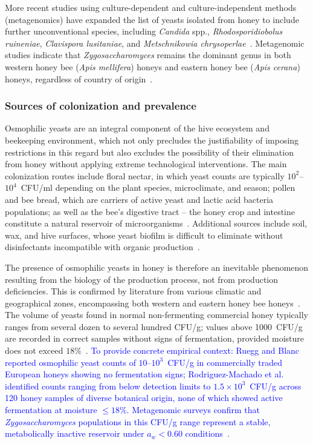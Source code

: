 More recent studies using culture-dependent and culture-independent
methods (metagenomics) have expanded the list of yeasts isolated
from honey to include further unconventional species, including
\textit{Candida} spp., \textit{Rhodosporidiobolus ruineniae},
\textit{Clavispora lusitaniae}, and \textit{Metschnikowia
chrysoperlae}~\cite{rodriguezmachado2024}.
Metagenomic studies indicate that \textit{Zygosaccharomyces}
remains the dominant genus in both western honey bee
(\textit{Apis mellifera}) honeys and eastern honey bee
(\textit{Apis cerana}) honeys, regardless of country of
origin~\cite{yeastbiodiversity2025}.

\subsubsection{Sources of colonization and prevalence}
Osmophilic yeasts are an integral component of the hive ecosystem
and beekeeping environment, which not only precludes the
justifiability of imposing restrictions in this regard but also
excludes the possibility of their elimination from honey without
applying extreme technological interventions. The main colonization
routes include floral nectar, in which yeast counts are typically
$10^2$--$10^4$~CFU/ml depending on the plant species, microclimate,
and season; pollen and bee bread, which are carriers of active
yeast and lactic acid bacteria populations; as well as the bee's
digestive tract -- the honey crop and intestine constitute a natural
reservoir of microorganisms~\cite{alwaili2012}.
Additional sources include soil, wax, and hive surfaces, whose yeast
biofilm is difficult to eliminate without disinfectants incompatible
with organic production~\cite{alwaili2012}.

The presence of osmophilic yeasts in honey is therefore an inevitable
phenomenon resulting from the biology of the production process,
not from production deficiencies. This is confirmed by literature
from various climatic and geographical zones, encompassing both
western and eastern honey bee
honeys~\cite{yeastbiodiversity2025}.
The volume of yeasts found in normal non-fermenting commercial
honey typically ranges from several dozen to several hundred CFU/g;
values above 1000~CFU/g are recorded in correct samples without
signs of fermentation, provided moisture does not exceed
$18\%$~\cite{analytica2020}.
\textcolor{blue}{To provide concrete empirical context: Ruegg and Blanc~\cite{ruegg1981}
reported osmophilic yeast counts of $10$--$10^3$~CFU/g in commercially
traded European honeys showing no fermentation signs; Rodrigue\-z-Machado
et al.~\cite{rodriguezmachado2024} identified counts ranging from below
detection limits to $1.5 \times 10^3$~CFU/g across 120 honey samples
of diverse botanical origin, none of which showed active fermentation
at moisture $\leq 18\%$. Metagenomic surveys confirm that
\textit{Zygosaccharomyces} populations in this CFU/g range represent
a stable, metabolically inactive reservoir under $a_w < 0.60$
conditions~\cite{yeastbiodiversity2025}.}


